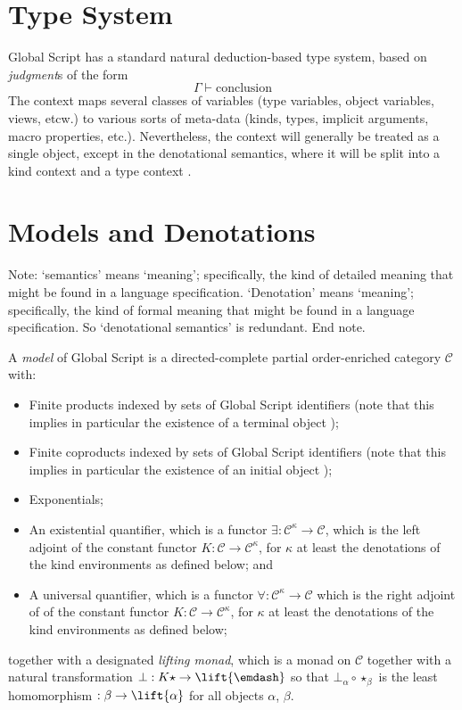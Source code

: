 \documentclass{report}
\newcommand\sequent\vdash
\newcommand\defn[1]{\emph{#1}}
\begin{document}
\section{Type System}

Global Script has a standard natural deduction-based type system, based on \defn{judgment}s of the form
\begin{displaymath}
    \Gamma \sequent \text{conclusion}
\end{displaymath}
The context \<\Gamma\> maps several classes of variables (type variables, object variables, views, etcw.) to various sorts of meta-data (kinds, types, implicit arguments, macro properties, etc.).
Nevertheless, the context will generally be treated as a single object, except in the denotational semantics,
where it will be split into a kind context \<\Delta\> and a type context \<\Gamma\>.

\section{Models and Denotations}

Note: `semantics' means `meaning'; specifically, the kind of detailed meaning that might be found in a language specification.
`Denotation' means `meaning'; specifically, the kind of formal meaning that might be found in a language specification.
So `denotational semantics' is redundant.
End note.

A \defn{model} of Global Script is a directed-complete partial order-enriched category $\mathcal{C}$ with:
\begin{itemize}
    \item Finite products indexed by sets of Global Script identifiers (note that this implies in particular the existence of a terminal object \<\star\>);
    \item Finite coproducts indexed by sets of Global Script identifiers (note that this implies in particular the existence of an initial object \<\epsilon\>);
    \item Exponentials;
    \item An existential quantifier, which is a functor $\exists : \mathcal{C}^\kappa \to \mathcal{C}$, which is the left adjoint of the constant functor $K : \mathcal{C} \to \mathcal{C}^\kappa$, for $\kappa$ at least the denotations of the kind environments as defined below; and
    \item A universal quantifier, which is a functor $\forall : \mathcal{C}^\kappa \to \mathcal{C}$ which is the right adjoint of of the constant functor $K : \mathcal{C} \to \mathcal{C}^\kappa$, for $\kappa$ at least the denotations of the kind environments as defined below;
\end{itemize}
together with a designated \defn{lifting monad}, which is a monad \<\lift{\emdash}\> on $\mathcal{C}$ together with a natural transformation $\bot : K\star \to \lift{\emdash}$ so that $\bot_\alpha \circ \star_\beta$ is the least homomorphism $: \beta \to \lift{\alpha}$ for all objects $\alpha$, $\beta$.
\end{document}
